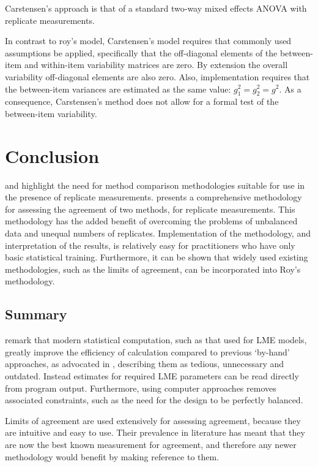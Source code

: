 \documentclass[12pt, a4paper]{report}
\theoremstyle{plain}
\theoremstyle{definition}
\theoremstyle{remark}
\begin{document}
	Carstensen's approach is that of a standard two-way mixed effects ANOVA with replicate measurements.
	
	In contrast to roy's model, Carstensen's model requires that commonly used assumptions be applied, specifically that the off-diagonal elements of the between-item and within-item variability matrices are zero. By
	extension the overall variability off-diagonal elements are also zero.
	Also, implementation requires that the between-item variances are estimated as the same value: $g^2_1 = g^2_2 = g^2$.
	As a consequence, Carstensen's method does not allow for a formal test of the between-item variability.
	

\section{Conclusion}
\citet{BXC2008} and \citet{ARoy2009} highlight the need for method comparison methodologies suitable for use in the presence of replicate measurements. \citet{ARoy2009} presents a comprehensive methodology for assessing the agreement of two methods, for replicate measurements. This methodology has the added benefit of overcoming the problems of unbalanced data and unequal numbers of replicates. Implementation of the methodology, and interpretation of the results, is relatively easy for practitioners who have only basic statistical training. Furthermore, it can be shown that widely used existing methodologies, such as the limits of agreement, can be incorporated into Roy's methodology.
	
	\subsection{Summary}
	\citet{BXC2008} remark that modern statistical computation, such as that used for LME models, greatly improve the efficiency of calculation compared to previous `by-hand' approaches, as advocated in \citet{BA99}, describing them as tedious, unnecessary and outdated. Instead estimates for required LME parameters can be read directly from program output. Furthermore, using computer approaches removes associated constraints, such as the need for the design to be perfectly balanced.
	
	
	
	Limits of agreement are used extensively for assessing agreement, because they are intuitive and easy to use. Their prevalence in literature has meant that they are now the best known measurement for agreement, and therefore any newer methodology would benefit by making reference to them.
	
\end{document}
